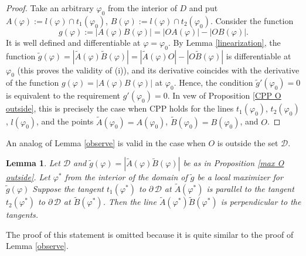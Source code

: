 \documentclass[a4paper,12pt]{amsart}
\newtheorem{lemma}[thm]{Lemma}
\begin{document}
\begin{proof}
Take an arbitrary $\varphi_0$  from the interior of $D$ and put
$A(\varphi):= l(\varphi) \cap t_1(\varphi_0)$, $B(\varphi):=
l(\varphi) \cap t_2(\varphi_0)$. Consider the function
$$g(\varphi):=|A(\varphi)B(\varphi)|=|OA(\varphi)| - |OB(\varphi)|.$$
It is well defined and differentiable at $\varphi = \varphi_0$. By Lemma \ref{linearization}, the function
 $\tilde{g}(\varphi) =|\tilde{A}(\varphi)\tilde{B}(\varphi)| = |\tilde{A}(\varphi)
 O| - |O \tilde{B}(\varphi)|$
 is differentiable at $\varphi_0$ (this proves the validity of (i)), and its derivative coincides with the derivative of the function
 $g(\varphi)=|A(\varphi)B(\varphi)|$ at $\varphi_0$. Hence, the condition $\tilde{g}'(\varphi_0)=0$ is equivalent to the requirement ${g}'(\varphi_0)=0.$   In vew of Proposition \ref{CPP O outside}, this is precisely the case when CPP holds for the lines $t_1(\varphi_0)$, $t_2(\varphi_0)$, $l(\varphi_0)$, and the points $\tilde{A}(\varphi_0) = A(\varphi_0)$, $\tilde{B}(\varphi_0)= B(\varphi_0)$, and $O$.
\end{proof}
An analog of Lemma \ref{observe} is valid in the case when $O$ is outside the set $\mathcal D$.

\begin{lemma} \label{observe1}
Let $\mathcal D$ and $\tilde{g}(\varphi)=|\tilde{A}(\varphi)\tilde{B}(\varphi)|$
be as in Proposition \ref{max O outside}.
Let $\varphi^*$ from the interior of the domain of $\tilde{g}$ be a local maximizer
for $\tilde{g}(\varphi)$ Suppose
the tangent $t_1(\varphi^*)$ to $\partial \, \mathcal D$ at
$\tilde{A}(\varphi^*)$ is parallel to the tangent
$t_2(\varphi^*)$ to $\partial \, \mathcal D$ at
$\tilde{B}(\varphi^*)$. Then the line $\tilde{A}(\varphi^*)\tilde{B}(\varphi^*)$ is perpendicular to the tangents.
\end{lemma}

The proof of this statement is omitted because it is quite similar to the proof of Lemma \ref{observe}.
\end{document}
